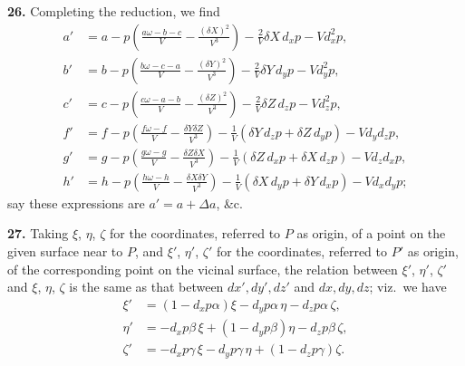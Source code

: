 \documentclass[11pt,a4paper]{article}
\theoremstyle{plain}
\begin{document}
\textbf{26.} Completing the reduction, we find
\begin{align*}
a' &= a - p\!\left( \frac{a\omega - b - c}{V} - \frac{(\delta X)^2}{V^3} \right) - \tfrac{2}{V}\delta X\, d_x p - V d_x^2 p, \\
b' &= b - p\!\left( \frac{b\omega - c - a}{V} - \frac{(\delta Y)^2}{V^3} \right) - \tfrac{2}{V}\delta Y\, d_y p - V d_y^2 p, \\
c' &= c - p\!\left( \frac{c\omega - a - b}{V} - \frac{(\delta Z)^2}{V^3} \right) - \tfrac{2}{V}\delta Z\, d_z p - V d_z^2 p, \\
f' &= f - p\!\left( \frac{f\omega - f}{V} - \frac{\delta Y\delta Z}{V^3} \right) - \tfrac{1}{V}(\delta Y\, d_z p + \delta Z\, d_y p) - V d_y d_z p, \\
g' &= g - p\!\left( \frac{g\omega - g}{V} - \frac{\delta Z\delta X}{V^3} \right) - \tfrac{1}{V}(\delta Z\, d_x p + \delta X\, d_z p) - V d_z d_x p, \\
h' &= h - p\!\left( \frac{h\omega - h}{V} - \frac{\delta X\delta Y}{V^3} \right) - \tfrac{1}{V}(\delta X\, d_y p + \delta Y\, d_x p) - V d_x d_y p;
\end{align*}
say these expressions are $a' = a + \Delta a$, \&c.

\textbf{27.} Taking $\xi$, $\eta$, $\zeta$ for the coordinates, referred to $P$ as origin, of a point on the
given surface near to $P$, and $\xi'$, $\eta'$, $\zeta'$ for the coordinates, referred to $P'$ as origin, of
the corresponding point on the vicinal surface, the relation between $\xi'$, $\eta'$, $\zeta'$ and $\xi$, $\eta$, $\zeta$
is the same as that between $dx', dy', dz'$ and $dx, dy, dz$; viz.\ we have
\begin{align*}
\xi' &= (1 - d_x p\alpha)\xi - d_y p\alpha\,\eta - d_z p\alpha\,\zeta, \\
\eta' &= -d_x p\beta\,\xi + (1 - d_y p\beta)\eta - d_z p\beta\,\zeta, \\
\zeta' &= -d_x p\gamma\,\xi - d_y p\gamma\,\eta + (1 - d_z p\gamma)\zeta.
\end{align*}
\end{document}
